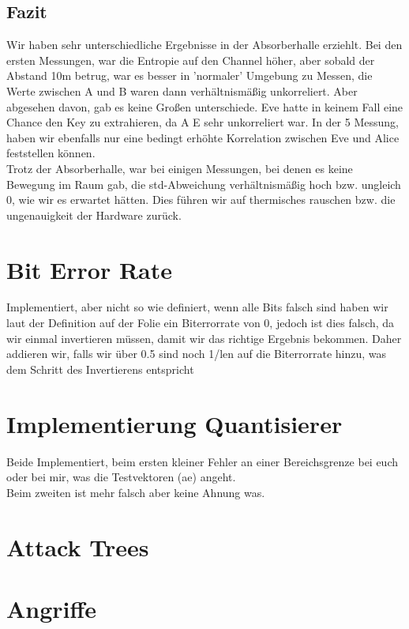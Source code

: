 \documentclass[12pt,a4paper]{article}
\begin{document}
\subsection*{Fazit}
Wir haben sehr unterschiedliche Ergebnisse in der Absorberhalle erziehlt. Bei den ersten Messungen, war die Entropie auf den Channel höher, aber sobald der Abstand 10m betrug, war es besser in 'normaler' Umgebung zu Messen, die Werte zwischen A und B waren dann verhältnismäßig unkorreliert. Aber abgesehen davon, gab es keine Großen unterschiede. Eve hatte in keinem Fall eine Chance den Key zu extrahieren, da A E sehr unkorreliert war. In der 5 Messung, haben wir ebenfalls nur eine bedingt erhöhte Korrelation zwischen Eve und Alice feststellen können.\\
Trotz der Absorberhalle, war bei einigen Messungen, bei denen es keine Bewegung im Raum gab, die std-Abweichung verhältnismäßig hoch bzw. ungleich 0, wie wir es erwartet hätten. Dies führen wir auf thermisches rauschen bzw. die ungenauigkeit der Hardware zurück.
\clearpage
\section{Bit Error Rate}
Implementiert, aber nicht so wie definiert, wenn alle Bits falsch sind haben wir laut der Definition auf der Folie ein Biterrorrate von 0, jedoch ist dies falsch, da wir einmal invertieren müssen, damit wir das richtige Ergebnis bekommen. Daher addieren wir, falls wir über 0.5 sind noch 1/len auf die Biterrorrate hinzu, was dem Schritt des Invertierens entspricht
\section{Implementierung Quantisierer}
Beide Implementiert, beim ersten kleiner Fehler an einer Bereichsgrenze bei euch oder bei mir, was die Testvektoren (ae) angeht.\\
Beim zweiten ist mehr falsch aber keine Ahnung was.
\section{Attack Trees}
\section{Angriffe}
\end{document}
